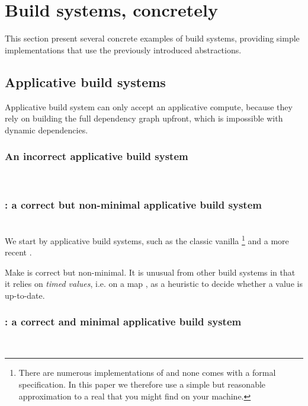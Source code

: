\clearpage
\section{Build systems, concretely}\label{sec-examples}

This section present several concrete examples of build systems, providing
simple implementations that use the previously introduced abstractions.

\subsection{Applicative build systems}

Applicative build system can only accept an applicative compute, because they
rely on building the full dependency graph upfront, which is impossible with
dynamic dependencies.

\vspace{4mm}
\subsubsection{An incorrect applicative build system}~\\


\vspace{4mm}
\subsubsection{\Make: a correct but non-minimal applicative build system}~\\

We start by applicative build systems, such as the classic vanilla
\Make\footnote{There are numerous implementations of \Make and none comes with a
formal specification. In this paper we therefore use a simple but reasonable
approximation to a real \Make that you might find on your machine.} and a more
recent \Ninja.

Make is correct but non-minimal. It is unusual from other build systems in that
it relies on \emph{timed values}, i.e. on a map , as a
heuristic to decide whether a value is up-to-date.


\vspace{4mm}
\subsubsection{\Ninja: a correct and minimal applicative build system}~\\

